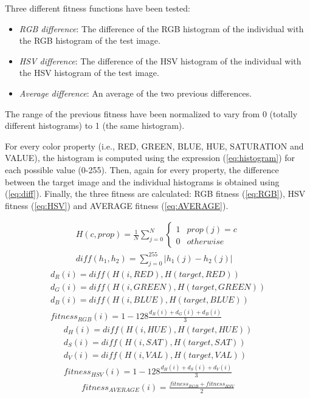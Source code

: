 \documentclass[a4paper,twoside]{article}
\begin{document}
Three different fitness functions have been tested:
\begin{itemize}
\item {\em RGB difference}: The difference of the RGB histogram of the individual with the RGB histogram of the test image.
\item {\em HSV difference}: The difference of the HSV histogram of the individual with the HSV histogram of the test image.
\item {\em Average difference}: An average of the two previous differences.
\end{itemize}

The range of the previous fitness have been normalized to vary from 0 (totally different histograms) to 1 (the same histogram).

For every color property (i.e., RED, GREEN, BLUE, HUE, SATURATION and VALUE), the histogram is computed using the expression (\ref{eq:histogram}) for each possible value (0-255). Then, again for every property, the difference between the target image and the individual histograms is obtained using (\ref{eq:diff}). Finally, the three fitness are calculated: RGB fitness (\ref{eq:RGB}), HSV fitness (\ref{eq:HSV}) and AVERAGE fitness (\ref{eq:AVERAGE}).

\begin{eqnarray}
	\label{eq:histogram}
	H(c, prop) = \frac{1}{N}\sum_{j=0}^N \left\{\begin{matrix}
1 & prop(j) = c\\ 
0 & otherwise
\end{matrix}\right. \\
\label{eq:diff}
diff(h_1, h_2) = \sum_{j=0}^{255} |h_1(j) - h_2(j)|
\end{eqnarray}
\begin{eqnarray}
	d_R(i) = diff(H(i, RED), H(target, RED))\\
	d_G(i) = diff(H(i, GREEN), H(target, GREEN))\\
	d_B(i) =  diff(H(i, BLUE), H(target, BLUE))\\
	\label{eq:RGB}
	fitness_{RGB}(i) = 1 - 128\frac{d_R(i) + d_G(i) + d_B(i)}{3}
\end{eqnarray}
\begin{eqnarray}
	d_H(i) = diff(H(i, HUE), H(target, HUE))\\
	d_S(i) = diff(H(i, SAT), H(target, SAT))\\
	d_V(i) =  diff(H(i, VAL), H(target, VAL))\\
	\label{eq:HSV}
	fitness_{HSV}(i) = 1 - 128\frac{d_H(i) + d_S(i) + d_V(i)}{3}
\end{eqnarray}
\begin{eqnarray}
	\label{eq:AVERAGE}
	fitness_{AVERAGE}(i) = \frac{fitness_{RGB}+fitness_{HSV}}{2}
\end{eqnarray}
\end{document}
